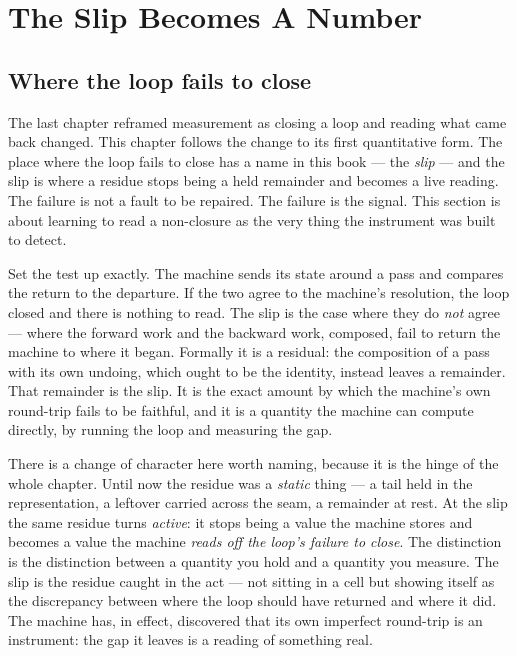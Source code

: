 \chapter{The Slip Becomes A Number}

\section{Where the loop fails to close}

The last chapter reframed measurement as closing a loop and reading what came back changed. This chapter follows the
change to its first quantitative form. The place where the loop fails to close has a name in this book --- the
\emph{slip} --- and the slip is where a residue stops being a held remainder and becomes a live reading. The failure is
not a fault to be repaired. The failure is the signal. This section is about learning to read a non-closure as the very
thing the instrument was built to detect.

Set the test up exactly. The machine sends its state around a pass and compares the return to the departure. If the two
agree to the machine's resolution, the loop closed and there is nothing to read. The slip is the case where they do
\emph{not} agree --- where the forward work and the backward work, composed, fail to return the machine to where it
began. Formally it is a residual: the composition of a pass with its own undoing, which ought to be the identity,
instead leaves a remainder. That remainder is the slip. It is the exact amount by which the machine's own round-trip
fails to be faithful, and it is a quantity the machine can compute directly, by running the loop and measuring the gap.

There is a change of character here worth naming, because it is the hinge of the whole chapter. Until now the residue
was a \emph{static} thing --- a tail held in the representation, a leftover carried across the seam, a remainder at
rest. At the slip the same residue turns \emph{active}: it stops being a value the machine stores and becomes a value
the machine \emph{reads off the loop's failure to close}. The distinction is the distinction between a quantity you hold
and a quantity you measure. The slip is the residue caught in the act --- not sitting in a cell but showing itself as
the discrepancy between where the loop should have returned and where it did. The machine has, in effect, discovered
that its own imperfect round-trip is an instrument: the gap it leaves is a reading of something real.

